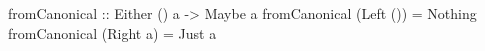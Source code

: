 \begin{code}
fromCanonical :: Either () a -> Maybe a
fromCanonical (Left ()) = Nothing
fromCanonical (Right a) = Just a
\end{code}
